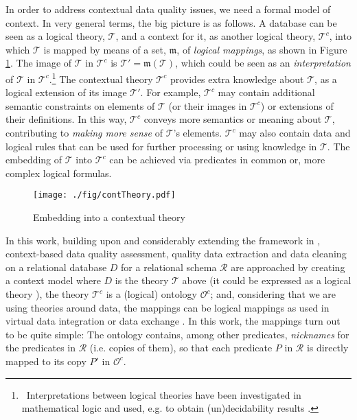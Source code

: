 \documentclass[format=acmsmall, review=false, screen=true]{acmart}
\newcommand{\mc}[1]{\mathcal{ #1}}
\newcommand{\mf}[1]{\mathfrak{ #1}}
\newcommand{\T}{\mc{T}}
\newcommand{\Tc}{\mc{T}^c}
\newcommand{\Tp}{\mc{T}'}
\newcommand{\red}[1]{{#1}}
\begin{document}
In order to address contextual data quality issues, we need a formal model of context. In very general terms, the big picture is as follows. A database can be seen as a logical theory, $\T$, and a context for it, as another logical theory, $\Tc$, into which $\T$ is mapped by means of a set, $\mf{m}$, of {\em logical mappings}, \red{as shown in Figure \ref{fig:emb}. The image of $\T$ in $\Tc$ is $\Tp=\mf{m}(\T)$, which could be seen as an {\em interpretation} of $\T$ in $\Tc$.\footnote{\ Interpretations between logical theories have been investigated in mathematical logic \cite[sec. 2.7]{enderton} and used, e.g. to obtain (un)decidability results \cite{rabin}.} The contextual theory $\Tc$ provides extra knowledge about $\T$, as a logical  extension of its image \red{$\Tp$}}. For example, $\Tc$ may contain  additional semantic constraints on elements of $\T$ (or their images in $\Tc$) or extensions of  their definitions. In this way, $\Tc$ conveys more semantics or meaning about $\T$, contributing to {\em making more sense} of $\T$'s elements. $\Tc$ may also contain  data and logical rules that can be used for further processing or using knowledge in $\T$. The embedding of $\T$ into $\Tc$ can be achieved via predicates in common or, more complex logical formulas.


\begin{figure}[h]
\begin{center}
\vspace{-2mm}
\texttt{[image: ./fig/contTheory.pdf]}
\caption{Embedding into a contextual theory}\label{fig:emb}
\vspace{-6mm}
\end{center}
\end{figure}




In this work, building upon and considerably extending the framework in \cite{bertossi-brite,bertossi16}, context-based data quality assessment, quality data extraction and data cleaning on a relational database $D$ \red{for a relational schema $\mc{R}$} are approached by creating a context model where $D$ is the theory $\T$ above (it could be expressed as a logical theory \cite{reiter}), the theory $\Tc$ is a (logical) ontology $\mc{O}^c$; and, considering that we are using theories around data, the mappings can be logical mappings as used in virtual data integration \cite{lenzerini} or data exchange \cite{barcelo}. In this work, the mappings turn out to be  quite simple: The ontology contains, among other predicates, {\em nicknames} for the predicates in \red{$\mc{R}$} (i.e. copies of them), so that each predicate $P$ in $\mc{R}$ is directly mapped to its copy $P'$ in $\mc{O}^c$.
\end{document}
